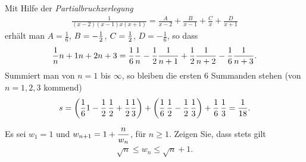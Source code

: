 \documentclass[11pt,a4paper]{article}
\begin{document}
\begin{loesung} Mit Hilfe der \emph{Partialbruchzerlegung} 
\begin{gather*}
\frac{1}{(x-2)(x-1)x(x+1)} =\frac{A}{x-2} +\frac{B}{x-1} +\frac{C}{x}
+\frac{D}{x+1}
\end{gather*}
erhält man $A=\frac{1}{6}$, $B=-\frac{1}{2}$, $C=\frac{1}{2}$, $D=-\frac{1}{6}$, so dass
\begin{gather*}
\frac{1}{n}{n+1}{n+2}{n+3}=\frac{1}{6} \frac{1}{n} -\frac{1}{2} \frac{1}{n+1} +\frac{1}{2}
\frac{1}{n+2} -\frac{1}{6} \frac{1}{n+3}.
\end{gather*}
Summiert man von $n=1$ bis $\infty$, so bleiben die ersten 6 Summanden stehen
(von $n=1,2,3 $ kommend)
\begin{gather*}
s=\left(\frac{1}{6} 1 -\frac{1}{2}\,\frac{1}{2} +\frac{1}{2} \frac{1}{3}\right) +\left( \frac{1}{6}
\,\frac{1}{2} -\frac{1}{2}\,\frac{1}{3}\right) +\frac{1}{6} \,\frac{1}{3} = \frac{1}{18}.
\end{gather*}
\end{loesung}

\begin{aufgabe}
Es sei $w_1=1$ und $\displaystyle w_{n+1}= 1 +\frac{n}{w_n}$, für $n\ge 1$.  Zeigen Sie,
dass stets gilt
\begin{gather*}
\sqrt{n} \le w_n \le \sqrt{n}+1.
\end{gather*}
\end{aufgabe}
\end{document}
